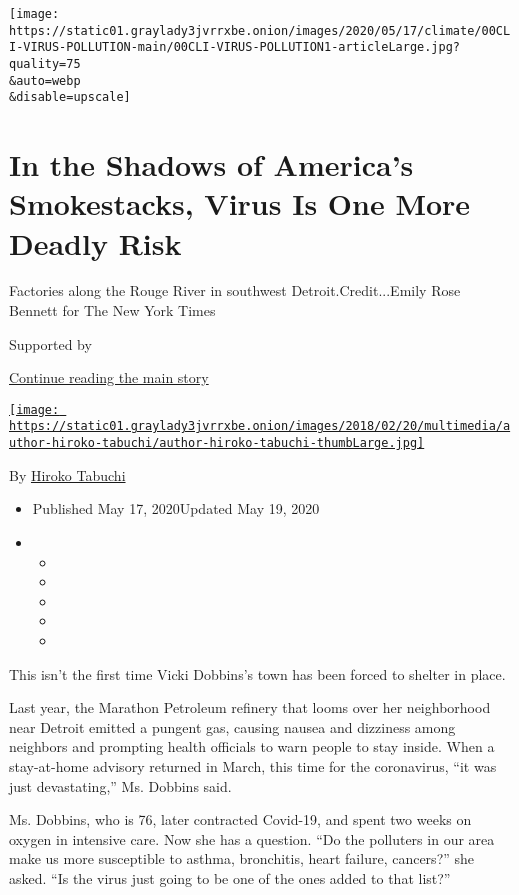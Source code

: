 \texttt{[image: https://static01.graylady3jvrrxbe.onion/images/2020/05/17/climate/00CLI-VIRUS-POLLUTION-main/00CLI-VIRUS-POLLUTION1-articleLarge.jpg?quality=75\\\&auto=webp\\\&disable=upscale]}

\hypertarget{in-the-shadows-of-americas-smokestacks-virus-is-one-more-deadly-risk}{%
\section{In the Shadows of America's Smokestacks, Virus Is One More
Deadly
Risk}\label{in-the-shadows-of-americas-smokestacks-virus-is-one-more-deadly-risk}}

Factories along the Rouge River in southwest Detroit.Credit...Emily Rose
Bennett for The New York Times

Supported by

\protect\hyperlink{after-sponsor}{Continue reading the main story}

\href{https://www.nytimes3xbfgragh.onion/by/hiroko-tabuchi}{\texttt{[image: https://static01.graylady3jvrrxbe.onion/images/2018/02/20/multimedia/author-hiroko-tabuchi/author-hiroko-tabuchi-thumbLarge.jpg]}}

By \href{https://www.nytimes3xbfgragh.onion/by/hiroko-tabuchi}{Hiroko
Tabuchi}

\begin{itemize}
\item
  Published May 17, 2020Updated May 19, 2020
\item
  \begin{itemize}
  \item
  \item
  \item
  \item
  \item
  \end{itemize}
\end{itemize}

This isn't the first time Vicki Dobbins's town has been forced to
shelter in place.

Last year, the Marathon Petroleum refinery that looms over her
neighborhood near Detroit emitted a pungent gas, causing nausea and
dizziness among neighbors and prompting health officials to warn people
to stay inside. When a stay-at-home advisory returned in March, this
time for the coronavirus, ``it was just devastating,'' Ms. Dobbins said.

Ms. Dobbins, who is 76, later contracted Covid-19, and spent two weeks
on oxygen in intensive care. Now she has a question. ``Do the polluters
in our area make us more susceptible to asthma, bronchitis, heart
failure, cancers?'' she asked. ``Is the virus just going to be one of
the ones added to that list?''


